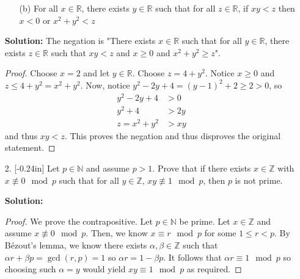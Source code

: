 \documentclass[letterpaper,12pt]{article}
\theoremstyle{definition}
\begin{document}
\pagebreak
\begin{enumerate}
    \item[] \begin{enumerate}
        \item[(b)] For all $x \in \mathbb{R}$, there exists $y \in \mathbb{R}$ such that for all $z \in \mathbb{R}$, if $xy < z$ then $x < 0$ or $x^2 + y^2 < z$ 
    \end{enumerate}
    \begin{mdframed}
            \textbf{Solution:}
            The negation is "There exists $x \in \mathbb{R}$ such that for all $y \in \mathbb{R}$, there exists $z \in \mathbb{R}$ such that $xy < z$ and $x \geq 0$ and $x^2 + y^2 \geq z$".
            \renewcommand{\proofname}{Disproof} \begin{proof}
                Choose $x = 2$ and let $y \in \mathbb{R}$. Choose $z = 4 + y^2$. Notice $x \geq 0$ and $z \leq 4 + y^2 = x^2 + y^2$. Now, notice $y^2 - 2y + 4 = (y-1)^2 + 2 \geq 2 > 0$, so \begin{align*}
                    y^2 -2y + 4 &> 0 \\
                    y^2 + 4 &> 2y \\
                    z = x^2 + y^2 &> xy
                \end{align*}
                and thus $xy < z$. This proves the negation and thus disproves the original statement.
            \end{proof}
        \end{mdframed}
\end{enumerate}
\pagebreak
\begin{enumerate}
    \item[2.]  \reversemarginpar{}[-0.24in] Let $p \in \mathbb{N}$ and assume $p > 1$. Prove that if there exists $x \in \mathbb{Z}$ with $x \not \equiv 0 \mod p$ such that for all $y \in \mathbb{Z}$, $xy \not \equiv 1 \mod p$, then $p$ is not prime.
    \begin{mdframed}
        \textbf{Solution:} \begin{proof}
            We prove the contrapositive. Let $p \in \mathbb{N}$ be prime. Let $x \in \mathbb{Z}$ and assume $x \not \equiv 0 \mod p$. Then, we know $x \equiv r \mod p$ for some $1 \leq r < p$. By Bézout's lemma, we know there exists $\alpha,\beta \in \mathbb{Z}$ such that $\alpha r + \beta p = \gcd (r,p) = 1$ so $\alpha r = 1 - \beta p$. It follows that $\alpha r \equiv 1 \mod p$ so choosing such $\alpha = y$ would yield $xy \equiv 1 \mod p$ as required.
        \end{proof}
    \end{mdframed}
\end{enumerate}
\end{document}
